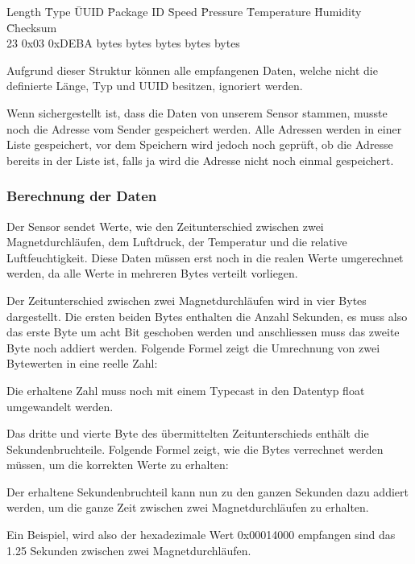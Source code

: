 \begin{tabbing}
   Length	\quad\= Type	\quad\= UUID 	\quad\= Package ID	\quad\= Speed	\quad\= Pressure	\quad\= Temperature	\quad\= Humidity	\quad\= Checksum   \\[0.8ex]
   23	\> 0x03	\> 0xDEBA  bytes bytes bytes bytes bytes \\
\end{tabbing}
Aufgrund dieser Struktur können alle empfangenen Daten, welche nicht die definierte Länge, Typ und UUID besitzen, ignoriert werden.

Wenn sichergestellt ist, dass die Daten von unserem Sensor stammen, musste noch die Adresse vom Sender gespeichert werden. Alle Adressen werden in einer Liste gespeichert, vor dem Speichern wird jedoch noch geprüft, ob die Adresse bereits in der Liste ist, falls ja wird die Adresse nicht noch einmal gespeichert.

\subsubsection{Berechnung der Daten}

Der Sensor sendet Werte, wie den Zeitunterschied zwischen zwei Magnetdurchläufen, dem Luftdruck, der Temperatur und die relative Luftfeuchtigkeit. Diese Daten müssen erst noch in die realen Werte umgerechnet werden, da alle Werte in mehreren Bytes verteilt vorliegen.

Der Zeitunterschied zwischen zwei Magnetdurchläufen wird in vier Bytes dargestellt. Die ersten beiden Bytes enthalten die Anzahl Sekunden, es muss also das erste Byte um acht Bit geschoben werden und anschliessen muss das zweite Byte noch addiert werden. Folgende Formel zeigt die Umrechnung von zwei Bytewerten in eine reelle Zahl:


Die erhaltene Zahl muss noch mit einem Typecast in den Datentyp float umgewandelt werden.

Das dritte und vierte Byte des übermittelten Zeitunterschieds enthält die Sekundenbruchteile. Folgende Formel zeigt, wie die Bytes verrechnet werden müssen, um die korrekten Werte zu erhalten:


Der erhaltene Sekundenbruchteil kann nun zu den ganzen Sekunden dazu addiert werden, um die ganze Zeit zwischen zwei Magnetdurchläufen zu erhalten.

Ein Beispiel, wird also der hexadezimale Wert 0x00014000 empfangen sind das 1.25 Sekunden zwischen zwei Magnetdurchläufen.

